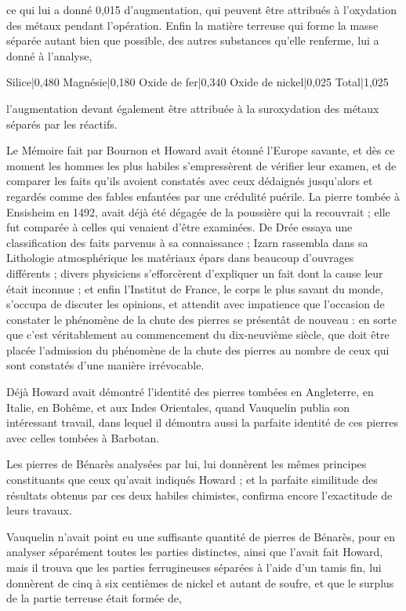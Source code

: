 \documentclass[a4paper, 12pt, oneside, french]{article}
\begin{document}
ce qui lui a donné 0,015 d'augmentation, qui peuvent être attribués à l'oxydation des métaux pendant l'opération. Enfin la matière terreuse qui forme la masse séparée autant bien que possible, des autres substances qu'elle renferme, lui a donné à l'analyse,

Silice|0,480  
Magnésie|0,180  
Oxide de fer|0,340  
Oxide de nickel|0,025  
Total|1,025

l'augmentation devant également être attribuée à la suroxydation des métaux séparés par les réactifs.

Le Mémoire fait par Bournon et Howard avait étonné l'Europe savante, et dès ce moment les hommes les plus habiles s'empressèrent de vérifier leur examen, et de comparer les faits qu'ils avoient constatés avec ceux dédaignés jusqu'alors et regardés comme des fables enfantées par une crédulité puérile. La pierre tombée à Ensisheim en 1492, avait déjà été dégagée de la poussière qui la recouvrait ; elle fut comparée à celles qui venaient d'être examinées. De Drée essaya une classification des faits parvenus à sa connaissance ; Izarn rassembla dans sa Lithologie atmosphérique les matériaux épars dans beaucoup d'ouvrages différents ; divers physiciens s'efforcèrent d'expliquer un fait dont la cause leur était inconnue ; et enfin l'Institut de France, le corps le plus savant du monde, s'occupa de discuter les opinions, et attendit avec impatience que l'occasion de constater le phénomène de la chute des pierres se présentât de nouveau : en sorte que c'est véritablement au commencement du dix-neuvième siècle, que doit être placée l'admission du phénomène de la chute des pierres au nombre de ceux qui sont constatés d'une manière irrévocable.

Déjà Howard avait démontré l'identité des pierres tombées en Angleterre, en Italie, en Bohême, et aux Indes Orientales, quand Vauquelin publia son intéressant travail, dans lequel il démontra aussi la parfaite identité de ces pierres avec celles tombées à Barbotan.

Les pierres de Bénarès analysées par lui, lui donnèrent les mêmes principes constituants que ceux qu'avait indiqués Howard ; et la parfaite similitude des résultats obtenus par ces deux habiles chimistes, confirma encore l'exactitude de leurs travaux.

Vauquelin n'avait point eu une suffisante quantité de pierres de Bénarès, pour en analyser séparément toutes les parties distinctes, ainsi que l'avait fait Howard, mais il trouva que les parties ferrugineuses séparées à l'aide d'un tamis fin, lui donnèrent de cinq à six centièmes de nickel et autant de soufre, et que le surplus de la partie terreuse était formée de,
\end{document}
